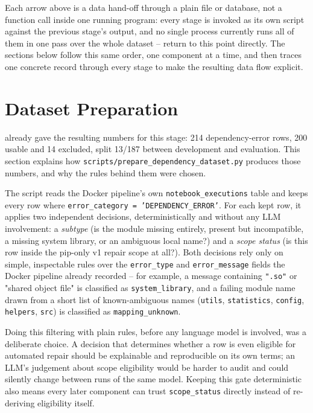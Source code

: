 Each arrow above is a data hand-off through a plain file or database, not a
function call inside one running program: every stage is invoked as its own
script against the previous stage's output, and no single process currently
runs all of them in one pass over the whole dataset --
 return to this point directly. The
sections below follow this same order, one component at a time, and
 then traces one concrete record through every
stage to make the resulting data flow explicit.

\section{Dataset Preparation}
\label{sec:m-dataset}

 already gave the resulting numbers for this
stage: 214 dependency-error rows, 200 usable and 14 excluded, split 13/187
between development and evaluation. This section explains how
\texttt{scripts/prepare\_dependency\_dataset.py} produces those numbers, and
why the rules behind them were chosen.

The script reads the Docker pipeline's own \texttt{notebook\_executions}
table and keeps every row where \texttt{error\_category = 'DEPENDENCY\_ERROR'}.
For each kept row, it applies two independent decisions, deterministically
and without any LLM involvement: a \emph{subtype} (is the module missing
entirely, present but incompatible, a missing system library, or an
ambiguous local name?) and a \emph{scope status} (is this row inside the
pip-only v1 repair scope at all?). Both decisions rely only on simple,
inspectable rules over the \texttt{error\_type} and \texttt{error\_message}
fields the Docker pipeline already recorded -- for example, a message
containing \texttt{".so"} or "shared object file" is classified as
\texttt{system\_library}, and a failing module name drawn from a short list
of known-ambiguous names (\texttt{utils}, \texttt{statistics},
\texttt{config}, \texttt{helpers}, \texttt{src}) is classified as
\texttt{mapping\_unknown}.

Doing this filtering with plain rules, before any language model is
involved, was a deliberate choice. A decision that determines whether a row
is even eligible for automated repair should be explainable and
reproducible on its own terms; an LLM's judgement about scope eligibility
would be harder to audit and could silently change between runs of the same
model. Keeping this gate deterministic also means every later component can
trust \texttt{scope\_status} directly instead of re-deriving eligibility
itself.

